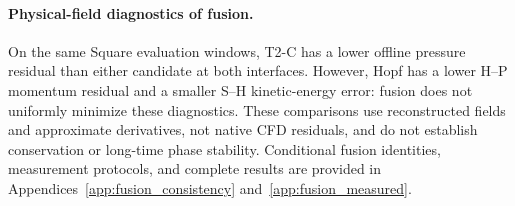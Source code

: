 \paragraph{Physical-field diagnostics of fusion.}
On the same Square evaluation windows, T2-C has a lower offline
pressure residual than either candidate at both interfaces. However,
Hopf has a lower H--P momentum residual and a smaller S--H kinetic-energy
error: fusion does not uniformly minimize these diagnostics.
These comparisons use reconstructed fields and approximate derivatives,
not native CFD residuals, and do not establish conservation or long-time
phase stability. Conditional fusion identities, measurement protocols,
and complete results are provided in
Appendices~\ref{app:fusion_consistency} and~\ref{app:fusion_measured}.
